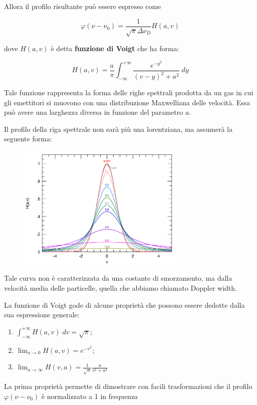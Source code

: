 Allora il profilo risultante può essere espresso come

$$\varphi(\nu - \nu_0)=\frac{1}{\sqrt{\pi} \Delta\nu_D} H(a,v)$$

dove $H(a,v)$ è detta \textbf{funzione di Voigt} che ha forma:

$$H(a,v)=\frac{a}{\pi} \int_{-\infty}^{+\infty} \frac{e^{-y^2}}{(v-y)^2 + a^2} \; dy$$

Tale funzione rappresenta la forma delle righe spettrali prodotta da un gas in cui gli emettitori si muovono con una distribuzione Maxwelliana delle velocità. Essa può avere una larghezza diversa in funzione del parametro $a$.

Il profilo della riga spettrale non sarà più una lorentziana, ma assumerà la seguente forma:

\begin{figure}[h]
  \centering
  \includegraphics[width=8cm]{immagini/voigt_profile.png}
  \label{fig:voigtprofile}
\end{figure}

Tale curva non è caratterizzata da una costante di smorzamento, ma dalla velocità media delle particelle, quella che abbiamo chiamato Doppler width.

La funzione di Voigt gode di alcune proprietà che possono essere dedotte dalla sua espressione generale:

\begin{enumerate}
  \item $\displaystyle \int_{-\infty}^{+\infty} H(a,v) \; dv=\sqrt{\pi}$;
  \item $\displaystyle \lim_{a \to 0} H(a,v)=e^{-v^2}$;
  \item $\displaystyle \lim_{a \to \infty} H(v,a)=\frac{1}{\sqrt{\pi}} \frac{a}{v^2 + a^2}$
\end{enumerate}

La prima proprietà permette di dimostrare con facili trasformazioni che il profilo $\varphi(\nu - \nu_0)$ è normalizzato a 1 in frequenza

